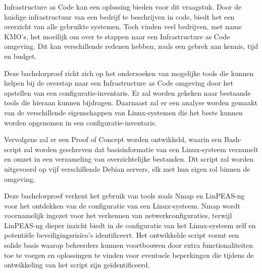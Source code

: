 Infrastructure as Code kan een oplossing bieden voor dit vraagstuk.
Door de huidige infrastructuur van een bedrijf te beschrijven in code, biedt het een overzicht van alle gebruikte systemen.
Toch vinden veel bedrijven, met name KMO's, het moeilijk om over te stappen naar een Infrastructure as Code omgeving.
Dit kan verschillende redenen hebben, zoals een gebrek aan kennis, tijd en budget.

Deze bachelorproef richt zich op het onderzoeken van mogelijke tools die kunnen helpen bij de overstap naar een Infrastructure as Code omgeving door het opstellen van een configuratie-inventaris.
Er zal worden gekeken naar bestaande tools die hieraan kunnen bijdragen.
Daarnaast zal er een analyse worden gemaakt van de verschillende eigenschappen van Linux-systemen die het beste kunnen worden opgenomen in een configuratie-inventaris.

Vervolgens zal er een Proof of Concept worden ontwikkeld, waarin een Bash-script zal worden geschreven dat basisinformatie van een Linux-systeem verzamelt en omzet in een verzameling van overzichtelijke bestanden.
Dit script zal worden uitgevoerd op vijf verschillende Debian servers, elk met hun eigen rol binnen de omgeving.

Deze bachelorproef verkent het gebruik van tools zoals Nmap en LinPEAS-ng voor het ontdekken van de configuratie van een Linux-systeem.
Nmap wordt voornamelijk ingezet voor het verkennen van netwerkconfiguraties, terwijl LinPEAS-ng dieper inzicht biedt in de configuratie van het Linux-systeem zelf en potentiële beveiligingsrisico's identificeert.
Het ontwikkelde script vormt een solide basis waarop beheerders kunnen voortbouwen door extra functionaliteiten toe te voegen en oplossingen te vinden voor eventuele beperkingen die tijdens de ontwikkeling van het script zijn geïdentificeerd.
